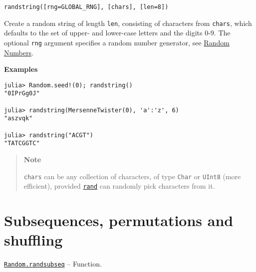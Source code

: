 \begin{adjustwidth}{2em}{0pt}


\begin{verbatim}
randstring([rng=GLOBAL_RNG], [chars], [len=8])
\end{verbatim}

Create a random string of length \texttt{len}, consisting of characters from \texttt{chars}, which defaults to the set of upper- and lower-case letters and the digits 0-9. The optional \texttt{rng} argument specifies a random number generator, see \href{@ref}{Random Numbers}.

\textbf{Examples}


\begin{verbatim}
julia> Random.seed!(0); randstring()
"0IPrGg0J"

julia> randstring(MersenneTwister(0), 'a':'z', 6)
"aszvqk"

julia> randstring("ACGT")
"TATCGGTC"
\end{verbatim}

\begin{quote}
\textbf{Note}

\texttt{chars} can be any collection of characters, of type \texttt{Char} or \texttt{UInt8} (more efficient), provided \hyperlink{7668863842145012694}{\texttt{rand}} can randomly pick characters from it.

\end{quote}


\end{adjustwidth}

\hypertarget{1694954649783113139}{}


\section{Subsequences, permutations and shuffling}


\hypertarget{10454370655022505544}{} 
\hyperlink{10454370655022505544}{\texttt{Random.randsubseq}}  -- {Function.}

